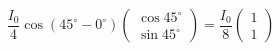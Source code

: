 \documentclass[12pt,a4paper]{article}
\begin{document}
\begin{enumerate}
\begin{equation*}
    \frac{I_{0}}{4} \cos{(45^{\circ} - 0 ^{\circ})}\left(\begin{array}{c}
         \cos{45^{\circ}}  \\
         \sin{45^{\circ}}
    \end{array}\right)=\frac{I_0}{8} \left(\begin{array}{c}
         1  \\
          1
    \end{array}\right)
\end{equation*}
    
    
\end{enumerate}
\end{document}
